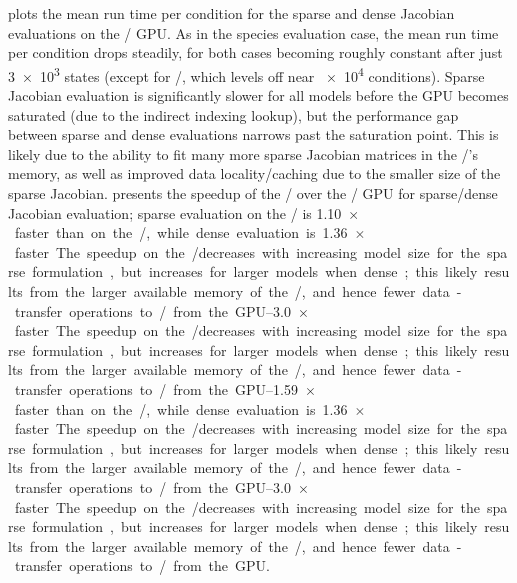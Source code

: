 \documentclass[12pt,number,sort&compress,preprint]{elsarticle}
\begin{document}
 plots the mean run time per condition for the sparse and dense Jacobian evaluations on the \gpunew/ GPU.
As in the species evaluation case, the mean run time per condition drops steadily, for both cases becoming roughly constant after just \num{3e3} states (except for \slash{}, which levels off near \num{e4} conditions).
Sparse Jacobian evaluation is significantly slower for all models before the GPU becomes saturated (due to the indirect indexing lookup), but the performance gap between sparse and dense evaluations narrows past the saturation point.
This is likely due to the ability to fit many more sparse Jacobian matrices in the \gpunew/'s memory, as well as improved data locality\slash caching due to the smaller size of the sparse Jacobian.
 presents the speedup of the \gpunew/ over the \gpuold/ GPU for sparse\slash dense Jacobian evaluation; sparse evaluation on the \gpunew/ is \SIrange{1.10}{1.59}{$\times$} faster than on the \gpuold/, while dense evaluation is \SIrange{1.36}{3.0}{$\times$} faster.
The speedup on the \gpunew/ decreases with increasing model size for the sparse formulation, but increases for larger models when dense; this likely results from the larger available memory of the \gpunew/, and hence fewer data-transfer operations to\slash from the GPU.
\end{document}
